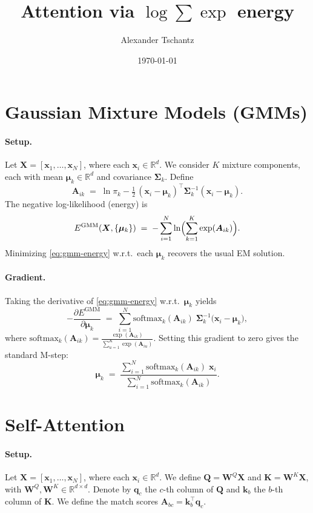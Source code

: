 \documentclass{article}
\begin{document}
\title{Attention via \(\log\sum\exp\) energy}
\author{Alexander Tschantz}
\date{\today}
\maketitle

\section{Gaussian Mixture Models (GMMs)}

\paragraph{Setup.}
Let \(\bm{X} = [\bm{x}_1, \ldots, \bm{x}_N]\), where each \(\bm{x}_i \in \mathbb{R}^d\). 
We consider \(K\) mixture components, each with mean \(\bm{\mu}_k \in \mathbb{R}^d\) and covariance \(\bm{\Sigma}_k\). 
Define 
\[
\bm{A}_{ik} 
\;=\; 
\ln \pi_k 
-\tfrac{1}{2}\,(\bm{x}_i - \bm{\mu}_k)^\top \bm{\Sigma}_k^{-1}(\bm{x}_i - \bm{\mu}_k).
\]
The negative log-likelihood (energy) is
\begin{equation}
E^{\mathrm{GMM}}(\bm{X}, \{\bm{\mu}_k\})
\;=\;
-\sum_{i=1}^N 
\ln \Bigl(\sum_{k=1}^K \exp(\bm{A}_{ik})\Bigr).
\label{eq:gmm-energy}
\end{equation}
Minimizing \eqref{eq:gmm-energy} w.r.t.\ each \(\bm{\mu}_k\) recovers the usual EM solution.

\paragraph{Gradient.}
Taking the derivative of \eqref{eq:gmm-energy} w.r.t.\ \(\bm{\mu}_k\) yields
\[
-\frac{\partial E^{\mathrm{GMM}}}{\partial \bm{\mu}_k}
\;=\;
\sum_{i=1}^N 
\text{softmax}_k(\bm{A}_{ik})
\;\bm{\Sigma}_k^{-1}
\bigl(\bm{x}_i - \bm{\mu}_k\bigr),
\]
where 
\(\text{softmax}_k(\bm{A}_{ik}) 
= \tfrac{\exp(\bm{A}_{ik})}{\sum_{u=1}^K \exp(\bm{A}_{iu})}.\)
Setting this gradient to zero gives the standard M-step:
\[
\bm{\mu}_k
\;=\;
\frac{\sum_{i=1}^N \text{softmax}_k(\bm{A}_{ik})\;\bm{x}_i}
     {\sum_{i=1}^N \text{softmax}_k(\bm{A}_{ik})}.
\]

\section{Self-Attention}

\paragraph{Setup.}
Let \(\bm{X} = [\bm{x}_1, \ldots, \bm{x}_N]\), where each \(\bm{x}_i \in \mathbb{R}^d\).  
We define 
\(\bm{Q} = \bm{W}^Q \bm{X}\) and \(\bm{K} = \bm{W}^K \bm{X}\), with \(\bm{W}^Q, \bm{W}^K \in \mathbb{R}^{d\times d}\).  
Denote by \(\bm{q}_c\) the \(c\)-th column of \(\bm{Q}\) and \(\bm{k}_b\) the \(b\)-th column of \(\bm{K}\).  
We define the match scores 
\(\bm{A}_{bc} = \bm{k}_b^\top \bm{q}_c.\)
\end{document}
